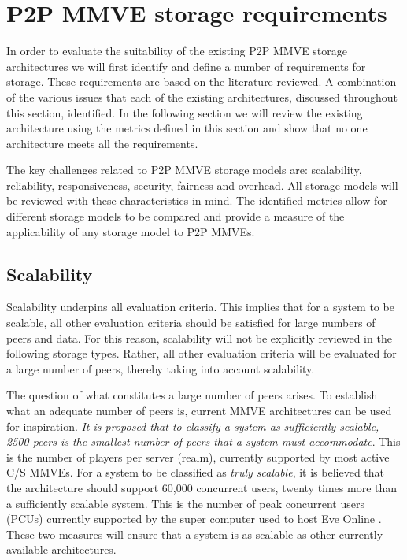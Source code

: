 \section{P2P MMVE storage requirements}
\label{key_challenges_cm}

In order to evaluate the suitability of the existing P2P MMVE storage architectures we will first identify and define a number of requirements for storage. These requirements are based on the literature reviewed. A combination of the various issues that each of the existing architectures, discussed throughout this section, identified. In the following section we will review the existing architecture using the metrics defined in this section and show that no one architecture meets all the requirements.

The key challenges related to P2P MMVE storage models are: scalability, reliability, responsiveness, security, fairness and overhead. All storage models will be reviewed with these characteristics in mind. The identified metrics allow for different storage models to be compared and provide a measure of the applicability of any storage model to P2P MMVEs.

\subsection{Scalability}
\label{scalability_req}
Scalability underpins all evaluation criteria. This implies that for a system to be scalable, all other evaluation criteria should be satisfied for large numbers of peers and data. For this reason, scalability will not be explicitly reviewed in the following storage types. Rather, all other evaluation criteria will be evaluated for a large number of peers, thereby taking into account scalability.

The question of what constitutes a large number of peers arises. To establish what an adequate number of peers is, current MMVE architectures can be used for inspiration. \emph{It is proposed that to classify a system as sufficiently scalable, 2500 peers is the smallest number of peers that a system must accommodate}. This is the number of players per server (realm), currently supported by most active C/S MMVEs. For a system to be classified as \emph{truly scalable}, it is believed that the architecture should support 60,000 concurrent users, twenty times more than a sufficiently scalable system. This is the number of peak concurrent users (PCUs) currently supported by the super computer used to host Eve Online \cite{eve_pcu}. These two measures will ensure that a system is as scalable as other currently available architectures.

